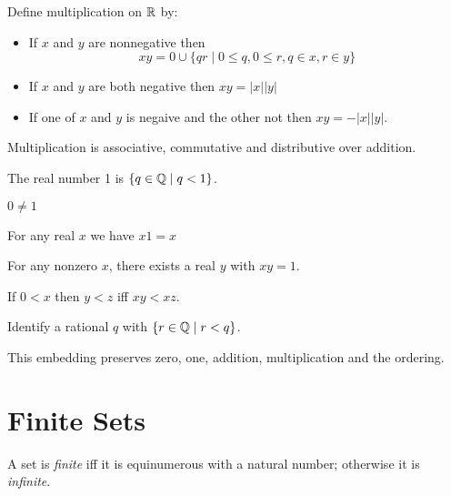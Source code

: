 \begin{definition}
    Define multiplication on $\mathbb{R}$ by:
    \begin{itemize}
        \item If $x$ and $y$ are nonnegative then
        \[ xy = 0 \cup \{ qr \mid 0 \leq q, 0 \leq r, q \in x, r \in y \} \]
        \item If $x$ and $y$ are both negative then $xy = |x| |y|$
        \item If one of $x$ and $y$ is negaive and the other not then $xy = -|x| |y|$.
    \end{itemize}
\end{definition}

\begin{theorem}
    Multiplication is associative, commutative and distributive over addition.
\end{theorem}

\begin{definition}
    The real number 1 is $\{ q \in \mathbb{Q} \mid q < 1 \}$.
\end{definition}

\begin{theorem}
    $0 \neq 1$
\end{theorem}

\begin{theorem}
    For any real $x$ we have $x1 = x$
\end{theorem}

\begin{theorem}
    For any nonzero $x$, there exists a real $y$ with $xy = 1$.
\end{theorem}

\begin{theorem}
    If $0 < x$ then $y < z$ iff $xy < xz$.
\end{theorem}

\begin{definition}
    Identify a rational $q$ with $\{ r \in \mathbb{Q} \mid r < q \}$.
\end{definition}

\begin{theorem}
    This embedding preserves zero, one, addition, multiplication and the ordering.
\end{theorem}

\chapter{Finite Sets}

\begin{definition}[Finite]
    A set is \emph{finite} iff it is equinumerous with a natural number;
    otherwise it is \emph{infinite}.
\end{definition}

